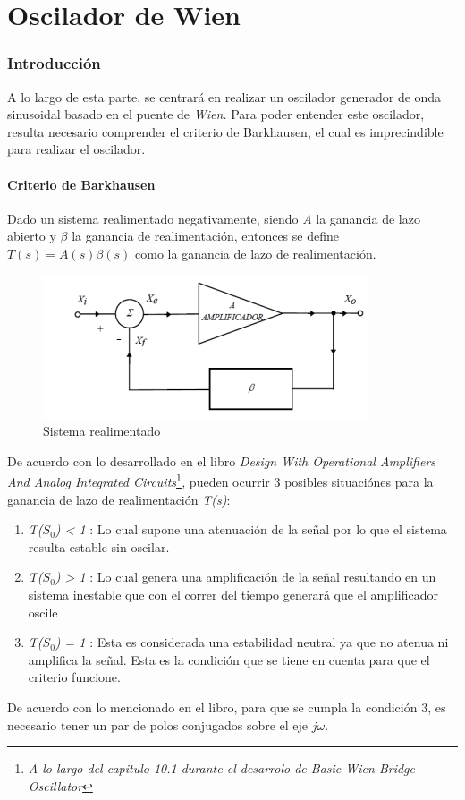 \part{Oscilador de Wien}


\section{Introducción}

A lo largo de esta parte, se centrará en realizar un oscilador generador
de onda sinusoidal basado en el puente de \emph{Wien.} Para poder
entender este oscilador, resulta necesario comprender el criterio
de Barkhausen, el cual es imprecindible para realizar el oscilador.

\subsection{Criterio de Barkhausen}

Dado un sistema realimentado negativamente, siendo \emph{A }la ganancia
de lazo abierto y $\beta$ la ganancia de realimentación, entonces
se define $T(s)=A(s)\beta(s)$ como la ganancia de lazo de realimentación.

\begin{figure}[h]
\begin{centering}
\includegraphics{../Ex1/Resources/Realimentado}
\par\end{centering}
\caption{Sistema realimentado}

\end{figure}

De acuerdo con lo desarrollado en el libro \emph{Design With Operational
Amplifiers And Analog Integrated Circuits}\footnote{\emph{A lo largo del capitulo 10.1 durante el desarrolo de Basic Wien-Bridge
Oscillator}}\emph{, }pueden ocurrir 3 posibles situaciónes para la ganancia de
lazo de realimentación \emph{T(s)}:
\begin{enumerate}
\item \emph{T($S_{0}$) < 1} : Lo cual supone una atenuación de la señal
por lo que el sistema resulta estable sin oscilar.
\item \emph{T($S_{0}$) > 1} : Lo cual genera una amplificación de la señal
resultando en un sistema inestable que con el correr del tiempo generará
que el amplificador oscile
\item \emph{T($S_{0}$) = 1} : Esta es considerada una estabilidad neutral
ya que no atenua ni amplifica la señal. Esta es la condición que se
tiene en cuenta para que el criterio funcione.
\end{enumerate}
De acuerdo con lo mencionado en el libro, para que se cumpla la condición
3, es necesario tener un par de polos conjugados sobre el eje $j\omega$.

